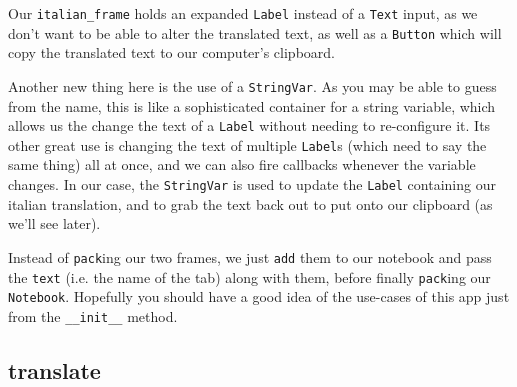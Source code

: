 \documentclass[a4paper,11pt,openany]{book}
\begin{document}
\vspace{5mm}

Our \lstinline[columns=fixed]{italian_frame} holds an expanded \lstinline[columns=fixed]{Label} instead of a \lstinline[columns=fixed]{Text} input, as we don't want to be able to alter the translated text, as well as a \lstinline[columns=fixed]{Button} which will copy the translated text to our computer's clipboard.  

\vspace{5mm}

Another new thing here is the use of a \lstinline[columns=fixed]{StringVar}. As you may be able to guess from the name, this is like a sophisticated container for a string variable, which allows us the change the text of a \lstinline[columns=fixed]{Label} without needing to re-configure it. Its other great use is changing the text of multiple \lstinline[columns=fixed]{Label}s (which need to say the same thing) all at once, and we can also fire callbacks whenever the variable changes. In our case, the \lstinline[columns=fixed]{StringVar} is used to update the \lstinline[columns=fixed]{Label} containing our italian translation, and to grab the text back out to put onto our clipboard (as we'll see later).

\vspace{5mm}

Instead of \lstinline[columns=fixed]{pack}ing our two frames, we just \lstinline[columns=fixed]{add} them to our notebook and pass the \lstinline[columns=fixed]{text} (i.e. the name of the tab) along with them, before finally \lstinline[columns=fixed]{pack}ing our \lstinline[columns=fixed]{Notebook}. Hopefully you should have a good idea of the use-cases of this app just from the \lstinline[columns=fixed]{__init__} method.

\subsection{translate}
\end{document}
